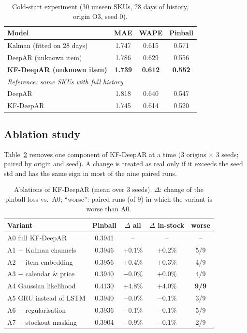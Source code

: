 \documentclass[conference]{IEEEtran}
\begin{document}
\begin{table}[t]
\centering
\caption{Cold-start experiment (30 unseen SKUs, 28 days of history, origin O3, seed 0).}
\label{tab:cold}
\begin{tabular}{lccc}
\toprule
Model & MAE & WAPE & Pinball\\
\midrule
Kalman (fitted on 28 days) & 1.747 & 0.615 & 0.571\\
DeepAR (unknown item) & 1.786 & 0.629 & 0.556\\
\textbf{KF-DeepAR (unknown item)} & \textbf{1.739} & \textbf{0.612} & \textbf{0.552}\\
\midrule
\multicolumn{4}{l}{\emph{Reference: same SKUs with full history}}\\
DeepAR & 1.818 & 0.640 & 0.547\\
KF-DeepAR & 1.745 & 0.614 & 0.520\\
\bottomrule
\end{tabular}
\end{table}

\subsection{Ablation study}
Table~\ref{tab:abl} removes one component of KF-DeepAR at a time (3 origins $\times$ 3 seeds; paired by origin and seed).
A change is treated as real only if it exceeds the seed std and has the same sign in most of the nine paired runs.

\begin{table}[t]
\centering
\caption{Ablations of KF-DeepAR (mean over 3 seeds). $\Delta$: change of the pinball loss vs.\ A0; ``worse'': paired runs (of 9) in which the variant is worse than A0.}
\label{tab:abl}
\begin{tabular}{lcccc}
\toprule
Variant & Pinball & $\Delta$ all & $\Delta$ in-stock & worse\\
\midrule
A0 full KF-DeepAR & 0.3941 & -- & -- & --\\
A1 $-$ Kalman channels & 0.3946 & $+0.1\%$ & $+0.2\%$ & 5/9\\
A2 $-$ item embedding & 0.3956 & $+0.4\%$ & $+0.3\%$ & 4/9\\
A3 $-$ calendar \& price & 0.3940 & $-0.0\%$ & $+0.0\%$ & 4/9\\
A4 Gaussian likelihood & 0.4130 & $\mathbf{+4.8\%}$ & $\mathbf{+4.0\%}$ & \textbf{9/9}\\
A5 GRU instead of LSTM & 0.3940 & $-0.0\%$ & $-0.1\%$ & 3/9\\
A6 $-$ regularisation & 0.3936 & $-0.1\%$ & $-0.1\%$ & 5/9\\
A7 $-$ stockout masking & 0.3904 & $-0.9\%$ & $-0.1\%$ & 2/9\\
\bottomrule
\end{tabular}
\end{table}
\end{document}
